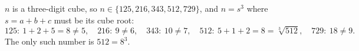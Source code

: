 $n$ is a three-digit cube, so $n\in\{125,216,343,512,729\}$, and $n=s^3$ where $s=a+b+c$ must be its cube root:
\[
125:\ 1+2+5=8\ne5,\quad 216:\ 9\ne6,\quad 343:\ 10\ne7,\quad 512:\ 5+1+2=8=\sqrt[3]{512},\quad 729:\ 18\ne9 .
\]
The only such number is $\boxed{512}=8^3$.
